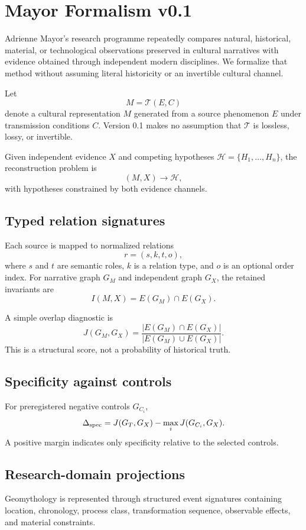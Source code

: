 \section{Mayor Formalism v0.1}

Adrienne Mayor's research programme repeatedly compares natural, historical,
material, or technological observations preserved in cultural narratives with
evidence obtained through independent modern disciplines.  We formalize that
method without assuming literal historicity or an invertible cultural channel.

Let
\[
M=\mathcal{T}(E,C)
\]
denote a cultural representation $M$ generated from a source phenomenon $E$
under transmission conditions $C$.  Version 0.1 makes no assumption that
$\mathcal{T}$ is lossless, lossy, or invertible.

Given independent evidence $X$ and competing hypotheses
$\mathcal H=\{H_1,\ldots,H_n\}$, the reconstruction problem is
\[
(M,X)\longrightarrow\mathcal H,
\]
with hypotheses constrained by both evidence channels.

\subsection{Typed relation signatures}

Each source is mapped to normalized relations
\[
r=(s,k,t,o),
\]
where $s$ and $t$ are semantic roles, $k$ is a relation type, and $o$ is an
optional order index.  For narrative graph $G_M$ and independent graph $G_X$,
the retained invariants are
\[
I(M,X)=E(G_M)\cap E(G_X).
\]

A simple overlap diagnostic is
\[
J(G_M,G_X)
=
\frac{|E(G_M)\cap E(G_X)|}
{|E(G_M)\cup E(G_X)|}.
\]
This is a structural score, not a probability of historical truth.

\subsection{Specificity against controls}

For preregistered negative controls $G_{C_i}$,
\[
\Delta_{\rm spec}
=
J(G_T,G_X)
-
\max_i J(G_{C_i},G_X).
\]
A positive margin indicates only specificity relative to the selected
controls.

\subsection{Research-domain projections}

Geomythology is represented through structured event signatures containing
location, chronology, process class, transformation sequence, observable
effects, and material constraints.

